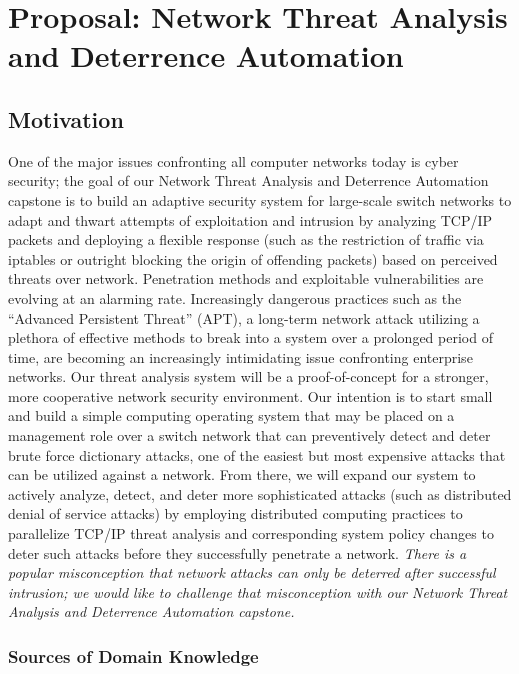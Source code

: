 \chapter{Proposal: Network Threat Analysis and Deterrence Automation}

\section{Motivation}

One of the major issues confronting all computer networks today is cyber security; the goal of our
Network Threat Analysis and Deterrence Automation capstone is to build an adaptive security system
for large-scale switch networks to adapt and thwart attempts of exploitation and intrusion by
analyzing TCP/IP packets and deploying a flexible response (such as the restriction of traffic via
iptables or outright blocking the origin of offending packets) based on perceived threats over network.
Penetration methods and exploitable vulnerabilities are evolving at an alarming rate.
Increasingly dangerous practices such as the ``Advanced Persistent Threat'' (APT), a long-term
network attack utilizing a plethora of effective methods to break into a system over a prolonged period
of time, are becoming an increasingly intimidating issue confronting enterprise networks. Our threat
analysis system will be a proof-of-concept for a stronger, more cooperative network security
environment.
Our intention is to start small and build a simple computing operating system that may be
placed on a management role over a switch network that can preventively detect and deter brute
force dictionary attacks, one of the easiest but most expensive attacks that can be utilized against a
network. From there, we will expand our system to actively analyze, detect, and deter more
sophisticated attacks (such as distributed denial of service attacks) by employing distributed
computing practices to parallelize TCP/IP threat analysis and corresponding system policy changes to
deter such attacks before they successfully penetrate a network.
\emph{
There is a popular misconception that network attacks can only be deterred after
successful intrusion; we would like to challenge that misconception with our Network
Threat Analysis and Deterrence Automation capstone.
}

\subsection{Sources of Domain Knowledge}

